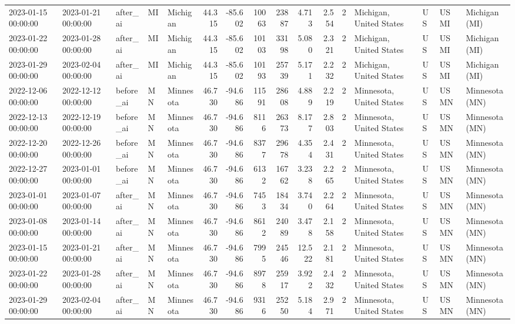 \begin{tabular}{lllllrrrrrrlllll}
2023-01-15 00:00:00 & 2023-01-21 00:00:00 & after\_ai & MI & Michigan & 44.315 & -85.602 & 10063 & 23887 & 4.713 & 2.554 & 2 & Michigan, United States & US & USMI & Michigan (MI) \\
2023-01-22 00:00:00 & 2023-01-28 00:00:00 & after\_ai & MI & Michigan & 44.315 & -85.602 & 10103 & 33198 & 5.080 & 2.321 & 2 & Michigan, United States & US & USMI & Michigan (MI) \\
2023-01-29 00:00:00 & 2023-02-04 00:00:00 & after\_ai & MI & Michigan & 44.315 & -85.602 & 10193 & 25739 & 5.171 & 2.232 & 2 & Michigan, United States & US & USMI & Michigan (MI) \\
2022-12-06 00:00:00 & 2022-12-12 00:00:00 & before\_ai & MN & Minnesota & 46.730 & -94.686 & 11591 & 28608 & 4.889 & 2.219 & 2 & Minnesota, United States & US & USMN & Minnesota (MN) \\
2022-12-13 00:00:00 & 2022-12-19 00:00:00 & before\_ai & MN & Minnesota & 46.730 & -94.686 & 8116 & 26373 & 8.177 & 2.803 & 2 & Minnesota, United States & US & USMN & Minnesota (MN) \\
2022-12-20 00:00:00 & 2022-12-26 00:00:00 & before\_ai & MN & Minnesota & 46.730 & -94.686 & 8377 & 29678 & 4.354 & 2.431 & 2 & Minnesota, United States & US & USMN & Minnesota (MN) \\
2022-12-27 00:00:00 & 2023-01-01 00:00:00 & before\_ai & MN & Minnesota & 46.730 & -94.686 & 6132 & 16762 & 3.238 & 2.265 & 2 & Minnesota, United States & US & USMN & Minnesota (MN) \\
2023-01-01 00:00:00 & 2023-01-07 00:00:00 & after\_ai & MN & Minnesota & 46.730 & -94.686 & 7453 & 18434 & 3.740 & 2.264 & 2 & Minnesota, United States & US & USMN & Minnesota (MN) \\
2023-01-08 00:00:00 & 2023-01-14 00:00:00 & after\_ai & MN & Minnesota & 46.730 & -94.686 & 8612 & 24089 & 3.478 & 2.158 & 2 & Minnesota, United States & US & USMN & Minnesota (MN) \\
2023-01-15 00:00:00 & 2023-01-21 00:00:00 & after\_ai & MN & Minnesota & 46.730 & -94.686 & 7995 & 24546 & 12.522 & 2.181 & 2 & Minnesota, United States & US & USMN & Minnesota (MN) \\
2023-01-22 00:00:00 & 2023-01-28 00:00:00 & after\_ai & MN & Minnesota & 46.730 & -94.686 & 8978 & 25917 & 3.922 & 2.432 & 2 & Minnesota, United States & US & USMN & Minnesota (MN) \\
2023-01-29 00:00:00 & 2023-02-04 00:00:00 & after\_ai & MN & Minnesota & 46.730 & -94.686 & 9316 & 25250 & 5.184 & 2.971 & 2 & Minnesota, United States & US & USMN & Minnesota (MN) \\

\end{tabular}
